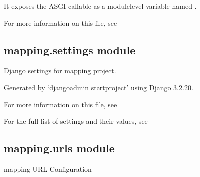 \documentclass[letterpaper,10pt,english]{sphinxmanual}
\begin{document}
\sphinxAtStartPar
It exposes the ASGI callable as a module\sphinxhyphen{}level variable named .

\sphinxAtStartPar
For more information on this file, see


\subsection{mapping.settings module}
\label{\detokenize{mapping:module-mapping.settings}}\label{\detokenize{mapping:mapping-settings-module}}
\sphinxAtStartPar
Django settings for mapping project.

\sphinxAtStartPar
Generated by ‘django\sphinxhyphen{}admin startproject’ using Django 3.2.20.

\sphinxAtStartPar
For more information on this file, see

\sphinxAtStartPar
For the full list of settings and their values, see


\subsection{mapping.urls module}
\label{\detokenize{mapping:module-mapping.urls}}\label{\detokenize{mapping:mapping-urls-module}}
\sphinxAtStartPar
mapping URL Configuration
\begin{description}
\sphinxAtStartPar
{}

\end{description}
\end{document}
